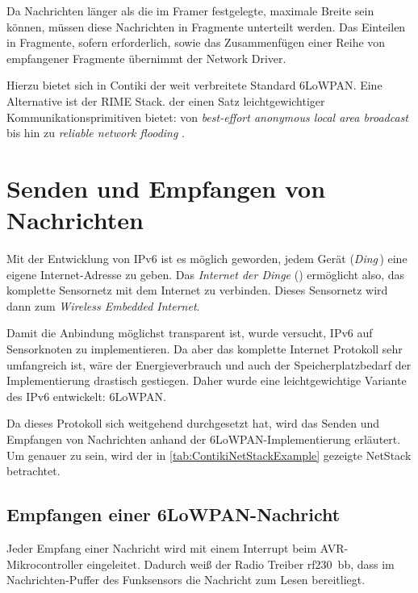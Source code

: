 	Da Nachrichten länger als die im Framer festgelegte, maximale Breite
	sein können, müssen diese Nachrichten in Fragmente unterteilt werden.
	Das Einteilen in Fragmente, sofern erforderlich, sowie das
	Zusammenfügen einer Reihe von empfangener Fragmente übernimmt der
	Network Driver.

	Hierzu bietet sich in Contiki der weit verbreitete Standard
	\acs{6LoWPAN}.  Eine Alternative ist der RIME Stack.  der einen Satz
	leichtgewichtiger Kommunikationsprimitiven bietet: von
	\emph{best-effort anonymous local area broadcast} bis hin zu
	\emph{reliable network flooding} \autocite{dunkels07adaptive}.


%


\section{Senden und Empfangen von Nachrichten}
\label{sec:NetStack:SendenEmpfangen}

	Mit der Entwicklung von IPv6 ist es möglich geworden, jedem Gerät
	(\emph{Ding}\,) eine eigene Internet-Adresse zu geben.  Das
	\emph{Internet der Dinge} () ermöglicht also,
	das komplette Sensornetz mit dem Internet zu verbinden.  Dieses
	Sensornetz wird dann zum \emph{Wireless Embedded Internet}.

	Damit die Anbindung möglichst transparent ist, wurde versucht, IPv6 auf
	Sensorknoten zu implementieren.  Da aber das komplette Internet
	Protokoll sehr umfangreich ist, wäre der Energieverbrauch und auch der
	Speicherplatzbedarf der Implementierung drastisch gestiegen.  Daher
	wurde eine leichtgewichtige Variante des IPv6 entwickelt:
	\acf{6LoWPAN}.

	Da dieses Protokoll sich weitgehend durchgesetzt hat, wird das Senden
	und Empfangen von Nachrichten anhand der \acs{6LoWPAN}-Implementierung
	erläutert.  Um genauer zu sein, wird der in
	\autoref{tab:ContikiNetStackExample} gezeigte \acl{NetStack}
	betrachtet.



\subsection{Empfangen einer 6LoWPAN-Nachricht}


	Jeder Empfang einer Nachricht wird mit einem Interrupt beim
	AVR-Mikrocontroller eingeleitet. Dadurch weiß der Radio Treiber
	rf230~bb, dass im Nachrichten-Puffer des Funksensors die Nachricht zum
	Lesen bereitliegt.

